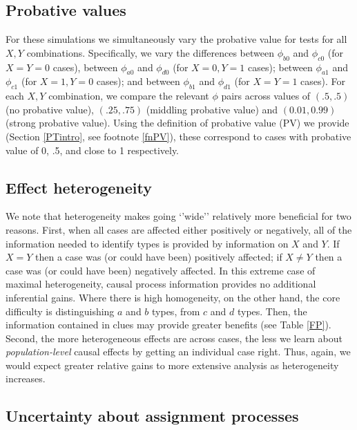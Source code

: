 \documentclass[12pt,]{book}
\begin{document}
\hypertarget{AppE1}{%
\subsection{Probative values}\label{AppE1}}

For these simulations we simultaneously vary the probative value for tests for all \(X,Y\) combinations. Specifically, we vary the differences between \(\phi_{b0}\) and \(\phi_{c0}\) (for \(X=Y=0\) cases), between \(\phi_{a0}\) and \(\phi_{d0}\) (for \(X=0, Y=1\) cases); between \(\phi_{a1}\) and \(\phi_{c1}\) (for \(X=1, Y=0\) cases); and between \(\phi_{b1}\) and \(\phi_{d1}\) (for \(X=Y=1\) cases). For each \(X,Y\) combination, we compare the relevant \(\phi\) pairs across values of \((.5,.5)\) (no probative value), \((.25,.75)\) (middling probative value) and \((0.01,0.99)\) (strong probative value). Using the definition of probative value (PV) we provide (Section \ref{PTintro}, see footnote \ref{fnPV}), these correspond to cases with probative value of 0, .5, and close to 1 respectively.

\hypertarget{AppE2}{%
\subsection{Effect heterogeneity}\label{AppE2}}

We note that heterogeneity makes going `'wide'' relatively more beneficial for two reasons. First, when all cases are affected either positively or negatively, all of the information needed to identify types is provided by information on \(X\) and \(Y\). If \(X=Y\) then a case was (or could have been) positively affected; if \(X \ne Y\) then a case was (or could have been) negatively affected. In this extreme case of maximal heterogeneity, causal process information provides no additional inferential gains. Where there is high homogeneity, on the other hand, the core difficulty is distinguishing \(a\) and \(b\) types, from \(c\) and \(d\) types. Then, the information contained in clues may provide greater benefits (see Table \ref{FP}). Second, the more heterogeneous effects are across cases, the less we learn about \emph{population-level} causal effects by getting an individual case right. Thus, again, we would expect greater relative gains to more extensive analysis as heterogeneity increases.

\hypertarget{AppE3}{%
\subsection{Uncertainty about assignment processes}\label{AppE3}}
\end{document}

